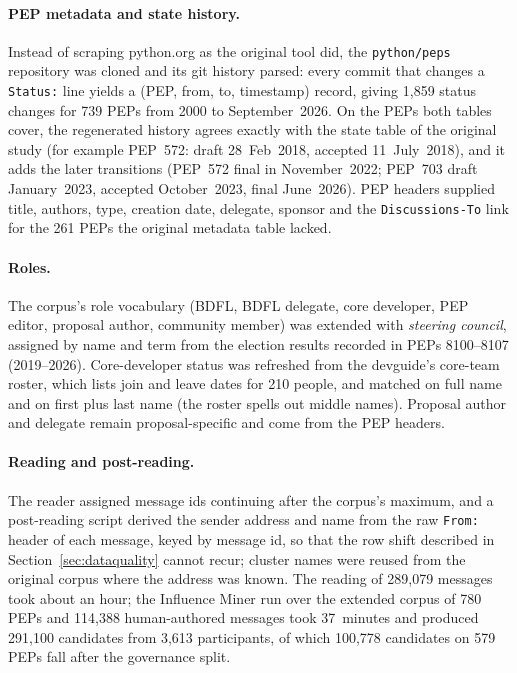 \paragraph{PEP metadata and state history.} Instead of scraping python.org as the original tool did, the \texttt{python/peps} repository was cloned and its git history parsed: every commit that changes a \texttt{Status:} line yields a (PEP, from, to, timestamp) record, giving 1,859 status changes for 739 PEPs from 2000 to September~2026. On the PEPs both tables cover, the regenerated history agrees exactly with the state table of the original study (for example PEP~572: draft 28~Feb~2018, accepted 11~July~2018), and it adds the later transitions (PEP~572 final in November~2022; PEP~703 draft January~2023, accepted October~2023, final June~2026). PEP headers supplied title, authors, type, creation date, delegate, sponsor and the \texttt{Discussions-To} link for the 261 PEPs the original metadata table lacked.

\paragraph{Roles.} The corpus's role vocabulary (BDFL, BDFL delegate, core developer, PEP editor, proposal author, community member) was extended with \emph{steering council}, assigned by name and term from the election results recorded in PEPs 8100--8107 (2019--2026). Core-developer status was refreshed from the devguide's core-team roster, which lists join and leave dates for 210 people, and matched on full name and on first plus last name (the roster spells out middle names). Proposal author and delegate remain proposal-specific and come from the PEP headers.

\paragraph{Reading and post-reading.} The reader assigned message ids continuing after the corpus's maximum, and a post-reading script derived the sender address and name from the raw \texttt{From:} header of each message, keyed by message id, so that the row shift described in Section~\ref{sec:dataquality} cannot recur; cluster names were reused from the original corpus where the address was known. The reading of 289,079 messages took about an hour; the Influence Miner run over the extended corpus of 780 PEPs and 114,388 human-authored messages took 37~minutes and produced 291,100 candidates from 3,613 participants, of which 100,778 candidates on 579 PEPs fall after the governance split.
